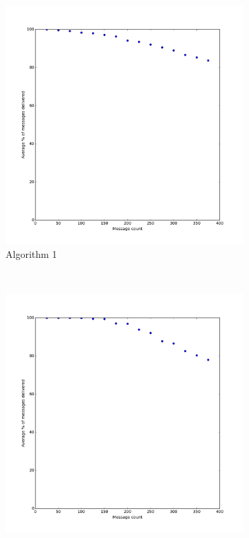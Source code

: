 \documentclass[bsc,frontabs,twoside,singlespacing,parskip,deptreport]{infthesis}     %
\begin{document}
\begin{figure}
  	\vspace{-25pt}
    \centering
    \begin{subfigure}[b]{0.3\textwidth}
        \includegraphics[width=\textwidth]{results/BasicShare_Prob0}
        \caption{Algorithm 1}
        \label{fig:results/BasicShare_Prob0}
    \end{subfigure}
    ~ %
    \begin{subfigure}[b]{0.3\textwidth}
        \includegraphics[width=\textwidth]{results/BasicShare_Prob40}

\end{subfigure}
\end{figure}
\end{document}
